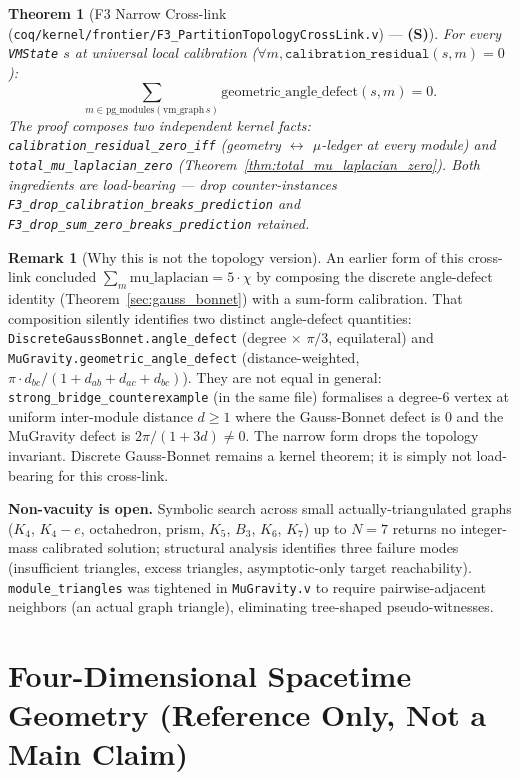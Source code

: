 \documentclass[11pt, a4paper]{report}
\theoremstyle{definition}
\newtheorem{remark}{Remark}[chapter]
\theoremstyle{plain}
\newtheorem{theorem}{Theorem}[chapter]
\begin{document}
\begin{theorem}[F3 Narrow Cross-link {\normalfont (\texttt{coq/kernel/frontier/F3\_PartitionTopologyCrossLink.v})} --- \textbf{(S)}]
\label{thm:f3_narrow}
For every \texttt{VMState} $s$ at universal local calibration ($\forall m, \texttt{calibration\_residual}(s, m) = 0$):
\[
\sum_{m \in \mathrm{pg\_modules}(\mathrm{vm\_graph}\,s)} \mathrm{geometric\_angle\_defect}(s, m) = 0.
\]
The proof composes two independent kernel facts: \texttt{calibration\_residual\_zero\_iff} (geometry $\leftrightarrow$ $\mu$-ledger at every module) and \texttt{total\_mu\_laplacian\_zero} (Theorem~\ref{thm:total_mu_laplacian_zero}). Both ingredients are load-bearing — drop counter-instances \texttt{F3\_drop\_calibration\_breaks\_prediction} and \texttt{F3\_drop\_sum\_zero\_breaks\_prediction} retained.
\end{theorem}

\begin{remark}[Why this is not the topology version]
\label{rem:f3_no_topology}
An earlier form of this cross-link concluded $\sum_m \mathrm{mu\_laplacian} = 5 \cdot \chi$ by composing the discrete angle-defect identity (Theorem~\ref{sec:gauss_bonnet}) with a sum-form calibration. That composition silently identifies two distinct angle-defect quantities: \texttt{DiscreteGaussBonnet.angle\_defect} (degree $\times$ $\pi/3$, equilateral) and \texttt{MuGravity.geometric\_angle\_defect} (distance-weighted, $\pi \cdot d_{bc}/(1 + d_{ab}+d_{ac}+d_{bc})$). They are not equal in general: \texttt{strong\_bridge\_counterexample} (in the same file) formalises a degree-6 vertex at uniform inter-module distance $d \geq 1$ where the Gauss-Bonnet defect is $0$ and the MuGravity defect is $2\pi/(1 + 3d) \neq 0$. The narrow form drops the topology invariant. Discrete Gauss-Bonnet remains a kernel theorem; it is simply not load-bearing for this cross-link.

\textbf{Non-vacuity is open.} Symbolic search across small actually-triangulated graphs ($K_4$, $K_4 - e$, octahedron, prism, $K_5$, $B_3$, $K_6$, $K_7$) up to $N = 7$ returns no integer-mass calibrated solution; structural analysis identifies three failure modes (insufficient triangles, excess triangles, asymptotic-only target reachability). \texttt{module\_triangles} was tightened in \texttt{MuGravity.v} to require pairwise-adjacent neighbors (an actual graph triangle), eliminating tree-shaped pseudo-witnesses.
\end{remark}

\section{Four-Dimensional Spacetime Geometry (Reference Only, Not a Main Claim)}
\end{document}
